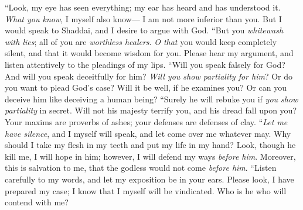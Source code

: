 \begin{biblechapter} %
 “Look, my eye has seen everything; 
my ear has heard and has understood it.
\verse \textit{What you know}, I myself also know— 
I am not more inferior than you.
\verse But I would speak to Shaddai, 
and I desire to argue with God.
\verse “But you \textit{whitewash with lies}; 
all of you are \textit{worthless healers}.
\verse \textit{O that} you would keep completely silent, 
and that it would become wisdom for you.
\verse Please hear my argument, 
and listen attentively to the pleadings of my lips.
\verse “Will you speak falsely for God? 
And will you speak deceitfully for him?
\verse \textit{Will you show partiality for him}? 
Or do you want to plead God’s case?
\verse Will it be well, if he examines you? 
Or can you deceive him like deceiving a human being?
\verse “Surely he will rebuke you 
if \textit{you show partiality} in secret.
\verse Will not his majesty terrify you, 
and his dread fall upon you?
\verse Your maxims are proverbs of ashes; 
your defenses are defenses of clay.
\verse “\textit{Let me have silence}, and I myself will speak, 
and let come over me whatever may.
\verse Why should I take my flesh in my teeth 
and put my life in my hand?
\verse Look, though he kill me, I will hope in him; 
however, I will defend my ways \textit{before him}.
\verse Moreover, this is salvation to me, 
that the godless would not come \textit{before him}.
\verse “Listen carefully to my words, 
and let my exposition be in your ears.
\verse Please look, I have prepared my case; 
I know that I myself will be vindicated.
\verse Who is he who will contend with me? 

\end{biblechapter}
